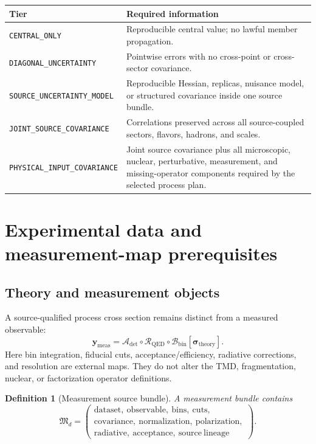 \documentclass[11pt]{article}
\newtheorem{definition}{Definition}[section]
\newcommand{\cR}{\mathcal R}
\newcommand{\cA}{\mathcal A}
\newcommand{\cB}{\mathcal B}
\begin{document}
\begin{longtable}{L{0.32\textwidth}L{0.60\textwidth}}
\toprule
Tier & Required information\\
\midrule
\endhead
\texttt{CENTRAL\_ONLY} & Reproducible central value; no lawful member propagation.\\
\texttt{DIAGONAL\_UNCERTAINTY} & Pointwise errors with no cross-point or cross-sector covariance.\\
\texttt{SOURCE\_UNCERTAINTY\_MODEL} & Reproducible Hessian, replicas, nuisance model, or structured covariance inside one source bundle.\\
\texttt{JOINT\_SOURCE\_COVARIANCE} & Correlations preserved across all source-coupled sectors, flavors, hadrons, and scales.\\
\texttt{PHYSICAL\_INPUT\_COVARIANCE} & Joint source covariance plus all microscopic, nuclear, perturbative, measurement, and missing-operator components required by the selected process plan.\\
\bottomrule
\end{longtable}

\section{Experimental data and measurement-map prerequisites}
\label{sec:measurement}

\subsection{Theory and measurement objects}

A source-qualified process cross section remains distinct from a measured observable:
\begin{equation}
 \bm y_{\mathrm{meas}}
 =
 \cA_{\mathrm{det}}
 \circ\cR_{\mathrm{QED}}
 \circ\cB_{\mathrm{bin}}
 \left[\bm\sigma_{\mathrm{theory}}\right].
 \label{eq:measurement-map}
\end{equation}
Here bin integration, fiducial cuts, acceptance/efficiency, radiative corrections, and resolution are external maps.  They do not alter the TMD, fragmentation, nuclear, or factorization operator definitions.

\begin{definition}[Measurement source bundle]
A measurement bundle contains
\begin{equation}
 \mathfrak M_d
 =
 \left(
 \begin{gathered}
 \mathrm{dataset},\ \mathrm{observable},\ \mathrm{bins},\ \mathrm{cuts},\\
 \mathrm{covariance},\ \mathrm{normalization},\ \mathrm{polarization},\\
 \mathrm{radiative},\ \mathrm{acceptance},\ \mathrm{source\ lineage}
 \end{gathered}
 \right).
 \label{eq:measurement-bundle}
\end{equation}
\end{definition}
\end{document}

